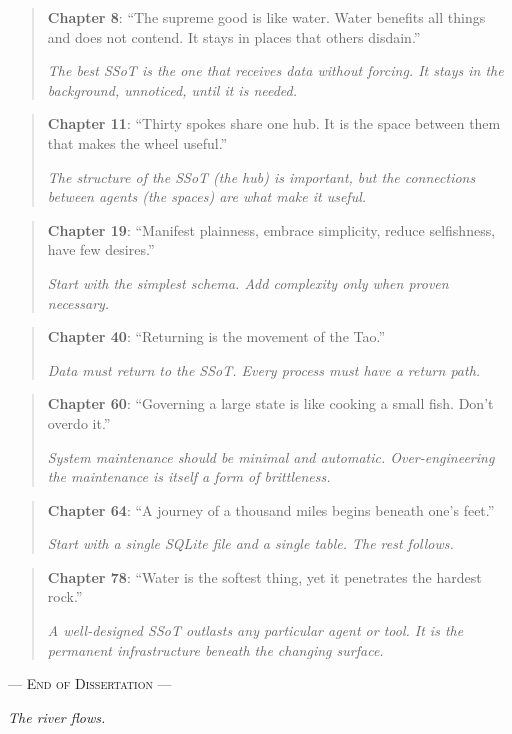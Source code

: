 \documentclass[12pt,a4paper,oneside]{book}
\begin{document}
\begin{quote}
\textbf{Chapter 8}: \enquote{The supreme good is like water. Water benefits all things and does not contend. It stays in places that others disdain.}
\par\smallskip
\emph{The best SSoT is the one that receives data without forcing. It stays in the background, unnoticed, until it is needed.}
\end{quote}

\begin{quote}
\textbf{Chapter 11}: \enquote{Thirty spokes share one hub. It is the space between them that makes the wheel useful.}
\par\smallskip
\emph{The structure of the SSoT (the hub) is important, but the connections between agents (the spaces) are what make it useful.}
\end{quote}

\begin{quote}
\textbf{Chapter 19}: \enquote{Manifest plainness, embrace simplicity, reduce selfishness, have few desires.}
\par\smallskip
\emph{Start with the simplest schema. Add complexity only when proven necessary.}
\end{quote}

\begin{quote}
\textbf{Chapter 40}: \enquote{Returning is the movement of the Tao.}
\par\smallskip
\emph{Data must return to the SSoT. Every process must have a return path.}
\end{quote}

\begin{quote}
\textbf{Chapter 60}: \enquote{Governing a large state is like cooking a small fish. Don't overdo it.}
\par\smallskip
\emph{System maintenance should be minimal and automatic. Over-engineering the maintenance is itself a form of brittleness.}
\end{quote}

\begin{quote}
\textbf{Chapter 64}: \enquote{A journey of a thousand miles begins beneath one's feet.}
\par\smallskip
\emph{Start with a single SQLite file and a single table. The rest follows.}
\end{quote}

\begin{quote}
\textbf{Chapter 78}: \enquote{Water is the softest thing, yet it penetrates the hardest rock.}
\par\smallskip
\emph{A well-designed SSoT outlasts any particular agent or tool. It is the permanent infrastructure beneath the changing surface.}
\end{quote}

\vfill
\centerline{\textsc{--- End of Dissertation ---}}
\centerline{\textit{The river flows.}}
\end{document}
